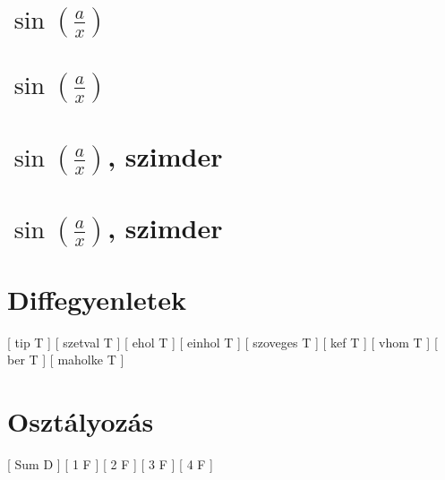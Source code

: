 \begin{spacing}{1.4}
\section*{$\sin(\frac{a}{x})$} \label{DBnumdiff1}
\Fa{

}
\vspace{0.5cm}
\newpage
\section*{$\sin(\frac{a}{x})$} \label{DBnumdiff1Mo}
\Mo{

}
\vspace{0.5cm}
\newpage
\section*{$\sin(\frac{a}{x})$, szimder} \label{DBnumdiff2}
\Fa{

}
\vspace{0.5cm}
\newpage
\section*{$\sin(\frac{a}{x})$, szimder} \label{DBnumdiff2Mo}
\Mo{

}
\vspace{0.5cm}
\newpage
\section*{Diffegyenletek} \label{DBode}
 [ tip T ]
\newline
{}
 [ szetval T ]
\newline
{}
 [ ehol T ]
\newline
{}
 [ einhol T ]
\newline
{}
 [ szoveges T ]
\newline
{}
 [ kef T ]
\newline
{}
 [ vhom T ]
\newline
{}
 [ ber T ]
\newline
{}
 [ maholke T ]
\vspace{0.5cm}
\newpage
\section*{Osztályozás} \label{DBodetip}
 [ Sum D ]
\newline
{}
 [ 1 F ]
\newline
{}
 [ 2 F ]
\newline
{}
 [ 3 F ]
\newline
{}
 [ 4 F ]
\vspace{0.5cm}
\newpage

\end{spacing}
